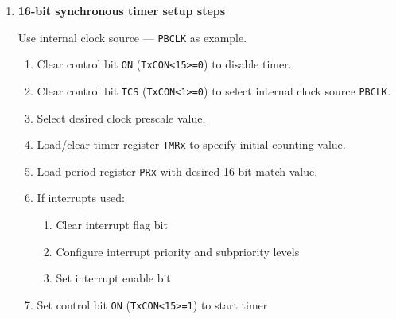 \documentclass[a4paper]{article}
\begin{document}
\begin{enumerate}[label = \arabic*.]
    \item \textbf{16-bit synchronous timer setup steps}
      \par Use internal clock source --- \verb|PBCLK| as example.
      \begin{enumerate}[label = \arabic*.]
        \item Clear control bit \verb|ON| (\verb|TxCON<15>=0|) to disable timer.
        \item Clear control bit \verb|TCS| (\verb|TxCON<1>=0|) to select internal clock source \verb|PBCLK|.
        \item Select desired clock prescale value.
        \item Load/clear timer register \verb|TMRx| to specify initial counting value.
        \item Load period register \verb|PRx| with desired 16-bit match value.
        \item If interrupts used:
          \begin{enumerate}[label = \roman*.]
            \item Clear interrupt flag bit
            \item Configure interrupt priority and subpriority levels
            \item Set interrupt enable bit
          \end{enumerate}
        \item Set control bit \verb|ON| (\verb|TxCON<15>=1|) to start timer
      \end{enumerate}

  \end{enumerate}
\end{document}
